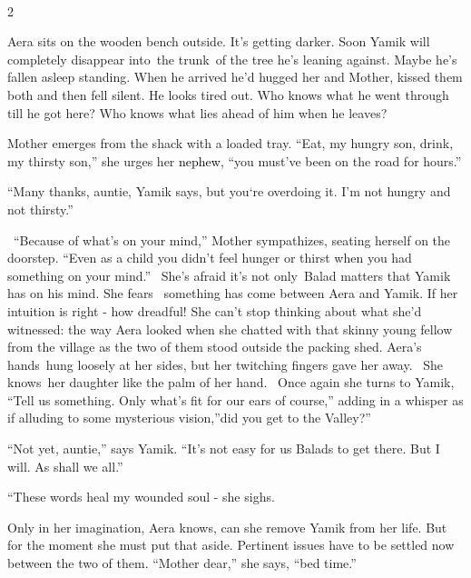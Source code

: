 \documentclass[letterpaper]{article}
\begin{document}
\textcolor[rgb]{0.13333334,0.13333334,0.13333334}{~}

\textcolor[rgb]{0.13333334,0.13333334,0.13333334}{2}

\textcolor[rgb]{0.13333334,0.13333334,0.13333334}{Aera sits on the wooden bench
out}side\textcolor[rgb]{0.13333334,0.13333334,0.13333334}{. }It's getting darker.
Soon\textcolor[rgb]{0.13333334,0.13333334,0.13333334}{ Yamik will completely disappear into~the trunk~of the tree he's
leaning against. Maybe he's fallen asleep standing. When he }arrived he'd hugged her and Mother, kissed them both and
then fell silent. He looks tired out. Who knows what he went through till he got here? Who knows what lies ahead of him
when he leaves? 

Mother emerges from the shack with a loaded tray. \textcolor[rgb]{0.13333334,0.13333334,0.13333334}{{}``Eat, my hungry
son, drink, my thirsty son,'' she urges her
}\textcolor{black}{nephew}\textcolor[rgb]{0.13333334,0.13333334,0.13333334}{, ``you must've been on the road for
hours.''}

\textcolor[rgb]{0.13333334,0.13333334,0.13333334}{{}``Many thanks, auntie,{\textquotedbl} Yamik says, {\textquotedbl}but
you`re overdoing it. I'm not hungry }and not \textcolor[rgb]{0.13333334,0.13333334,0.13333334}{thirsty.''}

\ {}``Because of what's on your mind,'' Mother sympathizes, seating herself on the doorstep. ``Even as a child you
didn't feel hunger or thirst when you had something on your mind.''~ She's afraid it's not only~Balad matters that
Yamik has on his mind. She fears \ something has come between Aera and Yamik. If her intuition is right - how dreadful!
She can't stop thinking about what she'd witnessed: the way Aera looked when she chatted with that
skinny\textcolor{red}{ }young fellow from the village as the two of them stood outside the packing shed. Aera's
hands~hung loosely at her sides, but her twitching fingers gave her away.~ She knows~her daughter like the palm of her
hand.~ Once again she turns to Yamik, ``Tell us something. Only what's fit for our ears of course,'' adding in a
whisper as if alluding to some mysterious vision,''did\textcolor{red}{ }you get to the Valley?'' 

{}``Not yet, auntie,'' says Yamik. ``It's not easy for us Balads to get there. But I will. As shall we all.'' 

{}``These words heal my wounded soul -{\textquotedbl} she sighs.

Only in her imagination, Aera knows, can she remove Yamik from her life. But for the moment she must put that aside.
Pertinent issues have to be settled now between the two of them. ``Mother dear,'' she says, ``bed time.''~ 
\end{document}
